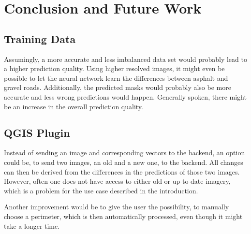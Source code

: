 
\chapter{Conclusion and Future Work}

\section{Training Data}
Assumingly, a more accurate and less imbalanced data set would probably lead to a higher prediction quality. Using higher resolved images, it might even be possible to let the neural network learn the differences between asphalt and gravel roads. Additionally, the predicted masks would probably also be more accurate and less wrong predictions would happen. Generally spoken, there might be an increase in the overall prediction quality.

\section{QGIS Plugin}
Instead of sending an image and corresponding vectors to the backend, an option could be, to send two images, an old and a new one, to the backend. All changes can then be derived from the differences in the predictions of those two images. However, often one does not have access to either old or up-to-date imagery,
which is a problem for the use case described in the introduction.

Another improvement would be to give the user the possibility, to manually choose a perimeter, which is then automatically processed, even though it might take a longer time.